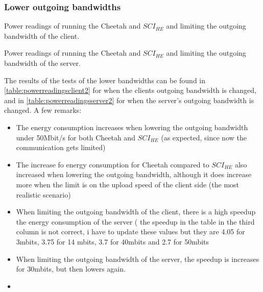 \documentclass[../thesis.tex]{subfiles}
\begin{document}
\newpage
\subsubsection{Lower outgoing bandwidths}
\begin{table}[ht]
        \begin{adjustbox}{width=\columnwidth,center}
                
        \end{adjustbox}
        \caption{Power readings of running the Cheetah and $SCI_{HE}$ and limiting the outgoing bandwidth of the client.}
        \label{table:powerreadingsclient2}
\end{table}

\begin{table}[ht]
        \begin{adjustbox}{width=\columnwidth,center}
                
        \end{adjustbox}
        \caption{Power readings of running the Cheetah and $SCI_{HE}$ and limiting the outgoing bandwidth of the server.}
        \label{table:powerreadingsserver2}
\end{table}
The results of the tests of the lower bandwidths can be found in \autoref{table:powerreadingsclient2} for when the clients outgoing bandwidth is changed, and in \autoref{table:powerreadingsserver2} for when the server's outgoing bandwidth is changed. A few remarks:

\begin{itemize}
    \item The energy consumption increases when lowering the outgoing bandwidth under 50Mbit/s for both Cheetah and $SCI_{HE}$ (as expected, since now the communication gets limited)
    \item The increase fo energy consumption for Cheetah compared to $SCI_{HE}$ also increased when lowering the outgoing bandwidth, although it does increase more when the limit is on the upload speed of the client side (the most realistic scenario)
    \item When limiting the outgoing bandwidth of the client, there is a high speedup the energy consumption of the server (\color{red} the speedup in the table in the third column is not correct, i have to update these values but they are 4.05 for 3mbits, 3.75 for 14 mbits, 3.7 for 40mbits and 2.7 for 50mbits\color{black}
    \item When limiting the outgoing bandwidth of the server, the speedup is increases for 30mbits, but then lowers again.
    \item 
\end{itemize}
\end{document}

